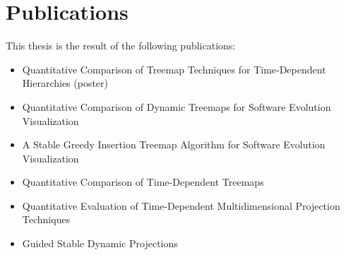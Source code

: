 \begingroup
\let\clearpage\relax
\let\cleardoublepage\relax
\let\cleardoublepage\relax

\manualmark
{} 

\chapter*{Publications}
This thesis is the result of the following publications:
\begin{itemize}
\item Quantitative Comparison of Treemap Techniques for Time-Dependent Hierarchies (poster) ~\citep{vernier17}
\item Quantitative Comparison of Dynamic Treemaps for Software Evolution Visualization~\citep{vernier18software}
\item A Stable Greedy Insertion Treemap Algorithm for Software Evolution Visualization~\citep{vernier18git}
\item Quantitative Comparison of Time-Dependent Treemaps~\citep{vernier_treemap}
\item Quantitative Evaluation of Time-Dependent Multidimensional Projection Techniques~\citep{Vernier2020}
\item Guided Stable Dynamic Projections~\citep{Vernier2021}
\end{itemize}



\endgroup

